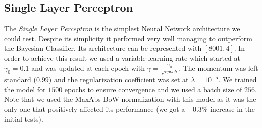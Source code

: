 \documentclass[10pt,a4paper]{report}
\begin{document}
\subsection{Single Layer Perceptron}
The \textit{Single Layer Perceptron} is the simplest Neural Network architecture we could test. Despite its simplicity it performed very well managing to outperform the Bayesian Classifier. Its architecture can be represented with $[8001, 4]$. In order to achieve this result we used a variable learning rate which started at $\gamma_0=0.1$ and was updated at each epoch with $\gamma=\frac{\gamma_0}{\sqrt{epoch}}$. The momentum was left standard ($0.99$) and the regularization coefficient was set at $\lambda=10^{-5}$. We trained the model for $1500$ epochs to ensure convergence and we used a batch size of $256$. Note that we used the MaxAbs BoW normalization with this model as it was the only one that positively affected its performance (we got a $+0.3 \%$ increase in the initial tests).
\end{document}
